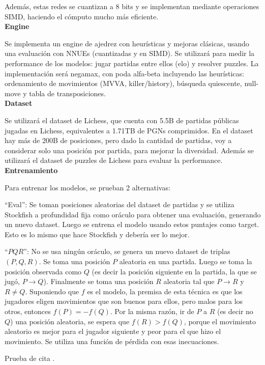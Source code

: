 \documentclass[12pt]{article}
\begin{document}
Además, estas redes se cuantizan a 8 bits y se implementan mediante operaciones SIMD, haciendo el cómputo mucho más eficiente. \\

\textbf{Engine}

Se implementa un engine de ajedrez con heurísticas y mejoras clásicas, usando una evaluación con NNUEs (cuantizadas y en SIMD). Se utilizará para medir la performance de los modelos: jugar partidas entre ellos (elo) y resolver puzzles.
La implementación será negamax, con poda alfa-beta incluyendo las heurísticas: ordenamiento de movimientos (MVVA, killer/history), búsqueda quiescente, null-move y tabla de transposiciones. \\

\textbf{Dataset}

Se utilizará el dataset de Lichess, que cuenta con 5.5B de partidas públicas jugadas en Lichess, equivalentes a 1.71TB de PGNs comprimidos. En el dataset hay más de 200B de posiciones, pero dado la cantidad de partidas, voy a considerar solo una posición por partida, para mejorar la diversidad. Además se utilizará el dataset de puzzles de Lichess para evaluar la performance. \\

\textbf{Entrenamiento}

Para entrenar los modelos, se prueban 2 alternativas:

``Eval'': Se toman posiciones aleatorias del dataset de partidas y se utiliza Stockfish a profundidad fija como oráculo para obtener una evaluación, generando un nuevo dataset. Luego se entrena el modelo usando estos puntajes como target. Esto es lo mismo que hace Stockfish y debería ser lo mejor.

``$PQR$'': No se usa ningún oráculo, se genera un nuevo dataset de triplas $(P,Q,R)$. Se toma una posición $P$ aleatoria en una partida. Luego se toma la posición observada como $Q$ (es decir la posición siguiente en la partida, la que se jugó, $P \rightarrow Q$). Finalmente se toma una posición $R$ aleatoria tal que $P \rightarrow R$ y $R \neq Q$. Suponiendo que $f$ es el modelo, la premisa de esta técnica es que los jugadores eligen movimientos que son buenos para ellos, pero malos para los otros, entonces $f(P)=-f(Q)$. Por la misma razón, ir de $P$ a $R$ (es decir no $Q$) una posición aleatoria, se espera que $f(R) > f(Q)$, porque el movimiento aleatorio es mejor para el jugador siguiente y peor para el que hizo el movimiento. Se utiliza una función de pérdida con esas inecuaciones.

Prueba de cita \cite{knuth:1984}.

\newpage
\printbibliography
\end{document}
